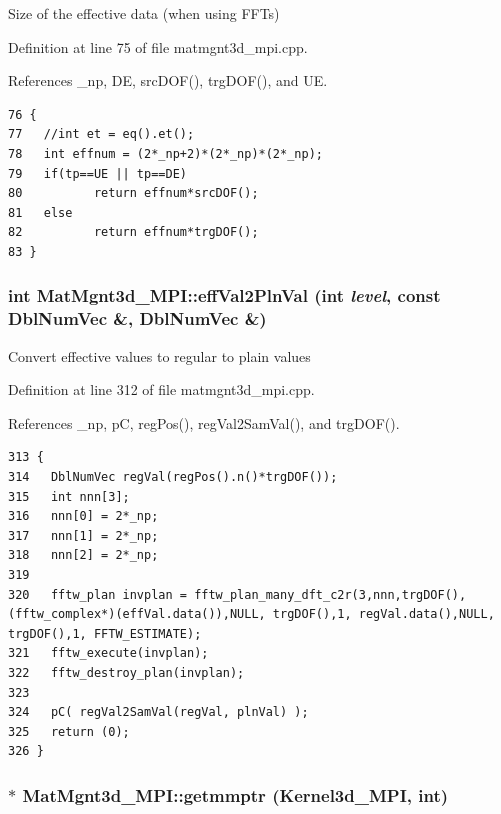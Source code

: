 Size of the effective data (when using FFTs) 

Definition at line 75 of file matmgnt3d\_\-mpi.cpp.

References \_\-np, DE, src\-DOF(), trg\-DOF(), and UE.

\footnotesize\begin{verbatim}76 {
77   //int et = eq().et();
78   int effnum = (2*_np+2)*(2*_np)*(2*_np);
79   if(tp==UE || tp==DE)
80          return effnum*srcDOF();
81   else
82          return effnum*trgDOF();
83 }
\end{verbatim}\normalsize 


\subsubsection{\setlength{\rightskip}{0pt plus 5cm}int Mat\-Mgnt3d\_\-MPI::eff\-Val2Pln\-Val (int {\em level}, const Dbl\-Num\-Vec \&, Dbl\-Num\-Vec \&)}\label{classMatMgnt3d__MPI_17b8e15860d967b5e69c356d0b11a215_17b8e15860d967b5e69c356d0b11a215}


Convert effective values to regular to plain values 

Definition at line 312 of file matmgnt3d\_\-mpi.cpp.

References \_\-np, p\-C, reg\-Pos(), reg\-Val2Sam\-Val(), and trg\-DOF().

\footnotesize\begin{verbatim}313 {
314   DblNumVec regVal(regPos().n()*trgDOF());
315   int nnn[3];
316   nnn[0] = 2*_np;
317   nnn[1] = 2*_np;
318   nnn[2] = 2*_np;
319   
320   fftw_plan invplan = fftw_plan_many_dft_c2r(3,nnn,trgDOF(), (fftw_complex*)(effVal.data()),NULL, trgDOF(),1, regVal.data(),NULL, trgDOF(),1, FFTW_ESTIMATE);
321   fftw_execute(invplan);
322   fftw_destroy_plan(invplan); 
323   
324   pC( regVal2SamVal(regVal, plnVal) );
325   return (0);
326 }
\end{verbatim}\normalsize 


\subsubsection{ $\ast$ Mat\-Mgnt3d\_\-MPI::getmmptr ({\bf Kernel3d\_\-MPI}, int)\hspace{0.3cm}{\tt  [static]}}\label{classMatMgnt3d__MPI_781b56ee3deb59e069610da0b13cfe9c_781b56ee3deb59e069610da0b13cfe9c}




